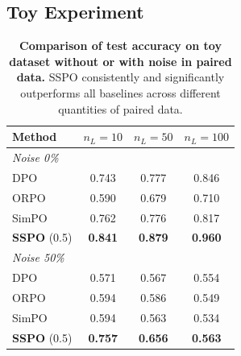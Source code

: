 \documentclass{article} %
\begin{document}
\subsection{Toy Experiment}
\setlength{\intextsep}{0pt} 
\begin{table} 
\vspace{-7mm}
    \centering
    \small 
    \setlength{\tabcolsep}{1.1mm} 
    \caption{\textbf{Comparison of test accuracy on toy dataset without or with noise in paired data.} SSPO consistently and significantly outperforms all baselines across different quantities of paired data.}
    \label{tab:toy_results_main}
    \vspace{-2mm}
    \begin{tabular}{l ccc}
        \toprule
        \textbf{Method} & $n_L=10$ & $n_L=50$ & $n_L=100$ \\
        \midrule
        \multicolumn{4}{l}{\textit{Noise 0\%}} \\
        DPO             & 0.743 & 0.777 & 0.846 \\
        ORPO            & 0.590 & 0.679 & 0.710 \\
        SimPO           & 0.762 & 0.776 & 0.817 \\
        \textbf{SSPO} (0.5) & \textbf{0.841} & \textbf{0.879} & \textbf{0.960} \\
        \midrule
        \multicolumn{4}{l}{\textit{Noise 50\%}} \\
        DPO             & 0.571 & 0.567 & 0.554 \\
        ORPO            & 0.594 & 0.586 & 0.549 \\
        SimPO           & 0.594 & 0.563 & 0.534 \\
        \textbf{SSPO} (0.5) & \textbf{0.757} & \textbf{0.656} & \textbf{0.563} \\
        \bottomrule
    \end{tabular}
\end{table}
\end{document}
